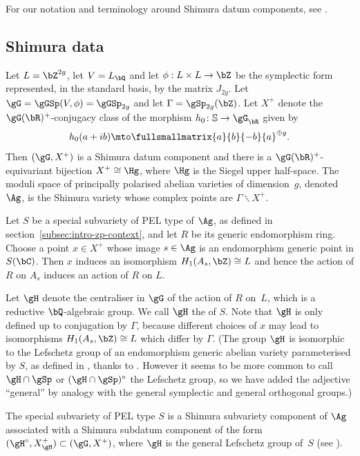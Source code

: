 For our notation and terminology around Shimura datum components, see \cite[sec.\ 2A and~2B]{ExCM}.

\subsection{Shimura data} \label{subsec:shimura-data}

Let $L=\bZ^{2g}$, let $V = L_\bQ$ and let $\phi:L\times L\to\bZ$ be the symplectic form represented, in the standard basis, by the matrix $J_{2g}$. Let $\gG=\gGSp(V, \phi)=\gGSp_{2g}$ and let $\Gamma=\gSp_{2g}(\bZ)$.
Let $X^+$ denote the $\gG(\bR)^+$-conjugacy class of the morphism $h_0 \colon \mathbb{S}\to\gG_\bR$ given by
\begin{equation} \label{eqn:h0}
h_0(a+ib) \mto \fullsmallmatrix{a}{b}{-b}{a}^{\oplus g}.
\end{equation}
Then $(\gG, X^+)$ is a Shimura datum component and there is a $\gG(\bR)^+$-equivariant bijection $X^+ \cong \Hg$, where $\Hg$ is the Siegel upper half-space.
The moduli space of principally polarised abelian varieties of dimension~$g$, denoted $\Ag$, is the Shimura variety whose complex points are $\Gamma \backslash X^+$.

Let $S$ be a special subvariety of PEL type of $\Ag$, as defined in section~\ref{subsec:intro-zp-context}, and let $R$ be its generic endomorphism ring.
Choose a point $x \in X^+$ whose image $s \in \Ag$ is an endomorphism generic point in $S(\bC)$.
Then $x$ induces an isomorphism $H_1(A_s, \bZ) \cong L$ and hence the action of $R$ on $A_s$ induces an action of $R$ on $L$.

Let $\gH$ denote the centraliser in $\gG$ of the action of $R$ on~$L$, which is a reductive $\bQ$-algebraic group.
We call $\gH$ the  of $S$.
Note that $\gH$ is only defined up to conjugation by $\Gamma$, because different choices of $x$ may lead to isomorphisms $H_1(A_s, \bZ) \cong L$ which differ by $\Gamma$.
(The group $\gH$ is isomorphic to the Lefschetz group of an endomorphism generic abelian variety parameterised by $S$, as defined in \cite{Mil99}, thanks to \cite[Th.\,4.4]{Mil99}.
However it seems to be more common to call $\gH \cap \gSp$ or $(\gH \cap \gSp)^\circ$ the Lefschetz group, so we have added the adjective ``general'' by analogy with the general symplectic and general orthogonal groups.)

The special subvariety of PEL type $S$ is a Shimura subvariety component of $\Ag$ associated with a Shimura subdatum component of the form $(\gH^\circ, X_\gH^+) \subset (\gG, X^+)$, where $\gH$ is the general Lefschetz group of~$S$ (see \cite[paragraph above Theorem~8.17]{Mil05}).

